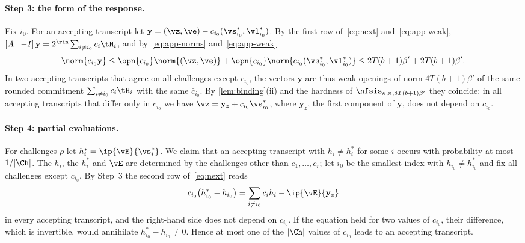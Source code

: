 \paragraph{Step 3: the form of the response.}
Fix $i_0$. For an accepting transcript let $\mathbf y=(\vz,\ve)-c_{i_0}(\vs^*_{i_0},\vl^*_{i_0})$. By the first row of~\eqref{eq:next} and~\eqref{eq:app-weak}, $[A\mid-I]\,\mathbf y=2^{\rin}\sum_{i\ne i_0}c_i\tH_i$, and by~\eqref{eq:app-norms} and~\eqref{eq:app-weak}
\[
\norm{\bar c_{i_0}\mathbf y}\le\opn{\bar c_{i_0}}\norm{(\vz,\ve)}+\opn{c_{i_0}}\norm{\bar c_{i_0}(\vs^*_{i_0},\vl^*_{i_0})}\le2T(b+1)\beta'+2T(b+1)\beta' .
\]
In two accepting transcripts that agree on all challenges except $c_{i_0}$, the vectors $\mathbf y$ are thus weak openings of norm $4T(b+1)\beta'$ of the same rounded commitment $\sum_{i\ne i_0}c_i\tH_i$ with the same $\bar c_{i_0}$. By \cref{lem:binding}(ii) and the hardness of $\nfsis_{\kappa,n,8T(b+1)\beta'}$ they coincide: in all accepting transcripts that differ only in $c_{i_0}$ we have $\vz=\mathbf y_z+c_{i_0}\vs^*_{i_0}$, where $\mathbf y_z$, the first component of $\mathbf y$, does not depend on $c_{i_0}$.

\paragraph{Step 4: partial evaluations.}
For challenges $\rho$ let $h^*_i=\ip{\vE}{\vs^*_i}$. We claim that an accepting transcript with $h_i\ne h^*_i$ for some $i$ occurs with probability at most $1/\lvert\Ch\rvert$. The $h_i$, the $h_i^*$ and $\vE$ are determined by the challenges other than $c_1,\dots,c_r$; let $i_0$ be the smallest index with $h_{i_0}\ne h^*_{i_0}$ and fix all challenges except $c_{i_0}$. By Step~3 the second row of~\eqref{eq:next} reads
\[
c_{i_0}\bigl(h^*_{i_0}-h_{i_0}\bigr)=\sum_{i\ne i_0}c_ih_i-\ip{\vE}{\mathbf y_z}
\]
in every accepting transcript, and the right-hand side does not depend on $c_{i_0}$. If the equation held for two values of $c_{i_0}$, their difference, which is invertible, would annihilate $h^*_{i_0}-h_{i_0}\ne0$. Hence at most one of the $\lvert\Ch\rvert$ values of $c_{i_0}$ leads to an accepting transcript.


